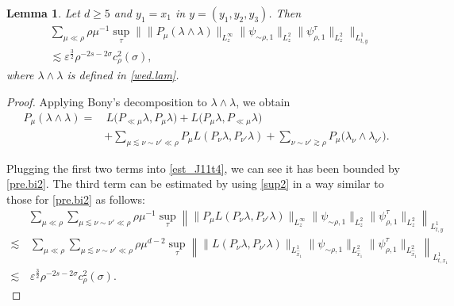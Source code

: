 \documentclass[11pt,letterpaper,reqno]{amsart}
\numberwithin{equation}{section}
\newtheorem{lemma}[theorem]{Lemma}
\theoremstyle{definition}
\theoremstyle{remark}
\begin{document}
 \begin{lemma}  \label{lem_J11t4}
Let \(d\geq5\) and \(y_1=x_1\) in \(y=(y_1,y_2,y_3)\). Then
\begin{align} 
 		& \sum_{\mu \ll \rho}  \rho \mu^{-1} \sup_\tau \big\| \| P_{\mu} \left(\lambda\wedge\lambda\right) \|_{L^\infty_z} \|     \psi_{\sim \rho ,1}\|_{L^2_z}   \|     \psi_{\rho,1}^\tau\|_{L^2_z}     \big\|_{L^1_{t,y}}  \nonumber\\
 &\lesssim  \varepsilon^{\frac32} \rho^{-2s -2\sigma}  c_{\rho }^2 (\sigma),\label{est_J11t4}
 	\end{align}
    where \(\lambda\wedge\lambda\) is defined in \eqref{wed.lam}.
 \end{lemma}
 \begin{proof}
Applying Bony's decomposition to \(\lambda\wedge\lambda\), we obtain
\begin{align}
P_\mu(\lambda\wedge\lambda)
=&\,
L\bigl(P_{\ll\mu}\lambda,P_\mu\lambda\bigr)
+
L\bigl(P_\mu\lambda,P_{\ll\mu}\lambda\bigr)  
\nonumber\\
&+ \sum_{\mu\lesssim \nu\sim\nu'\ll\rho} P_\mu L(P_\nu\lambda,P_{\nu'}\lambda)+
\sum_{\nu\sim\nu'\gtrsim\rho}
P_\mu\bigl(\lambda_\nu\wedge\lambda_{\nu'}\bigr).
\label{gauss.bony}
\end{align}


Plugging the first two terms into \eqref{est_J11t4}, we can see it has been bounded by \eqref{pre.bi2}. The third term can be estimated by using \eqref{sup2} in a way similar  to those for \eqref{pre.bi2} as follows:
\begin{align*}
&\sum_{\mu\ll\rho}
\sum_{\mu\lesssim\nu\sim\nu'\ll\rho}
\rho\mu^{-1}
\sup_\tau
\left\|
\|P_\mu L(P_\nu\lambda,P_{\nu'}\lambda)\|_{L_z^\infty}
\|\psi_{\sim\rho,1}\|_{L_z^2}
\|\psi_{\rho,1}^\tau\|_{L_z^2}
\right\|_{L_{t,y}^1}
\\
\lesssim&\, \sum_{\mu\ll\rho}
\sum_{\mu\lesssim\nu\sim\nu'\ll\rho}
\rho\mu^{d-2}
\sup_\tau
\left\|
\|  L(P_\nu\lambda,P_{\nu'}\lambda)\|_{L_{\widehat{x}_1}^1}
\|\psi_{\sim\rho,1}\|_{L_{\widehat{x}_1}^2}
\|\psi_{\rho,1}^\tau\|_{L_{\widehat{x}_1}^2}
\right\|_{L_{t,x_1}^1}\\
\lesssim &\,
\varepsilon^{\frac32}
\rho^{-2s-2\sigma}
c_\rho^2(\sigma).
\end{align*}


\end{proof}
\end{document}
